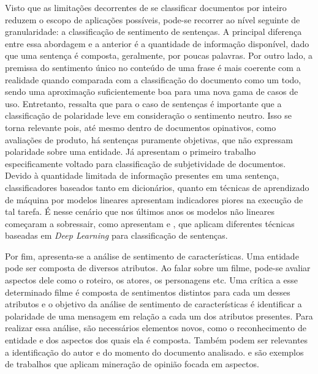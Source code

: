 Visto que as limitações decorrentes de se classificar documentos por inteiro
reduzem o escopo de aplicações possíveis, pode-se recorrer ao nível seguinte de
granularidade: a classificação de sentimento de sentenças.
A principal diferença entre essa abordagem e a anterior é a quantidade de
informação disponível, dado que uma sentença é composta, geralmente, por poucas
palavras.
Por outro lado, a premissa do sentimento único no conteúdo de uma frase é mais
coerente com a realidade quando comparada com a classificação do documento como um
todo, sendo uma aproximação suficientemente boa para uma nova gama de casos de uso.
Entretanto, \citet{liu15} ressalta que para o caso de sentenças é importante que
a classificação de polaridade leve em consideração o sentimento neutro.
Isso se torna relevante pois, até mesmo dentro de documentos opinativos, como
avaliações de produto, há sentenças puramente objetivas, que não expressam
polaridade sobre uma entidade.
Já \citet{riloff05} apresentam o primeiro trabalho especificamente voltado para
classificação de subjetividade de documentos.
Devido à quantidade limitada de informação presentes em uma sentença,
classificadores baseados tanto em dicionários, quanto em técnicas de
aprendizado de máquina por modelos lineares apresentam indicadores piores na
execução de tal tarefa.
É nesse cenário que nos últimos anos os modelos não lineares começaram a
sobressair, como apresentam \citet{socher11} e \citet{socher13}, que aplicam
diferentes técnicas baseadas em \textit{Deep Learning} para classificação de
sentenças.

Por fim, apresenta-se a análise de sentimento de características.
Uma entidade pode ser composta de diversos atributos.
Ao falar sobre um filme, pode-se avaliar aspectos dele como o roteiro, os
atores, os personagens etc.
Uma crítica a esse determinado filme é composta de sentimentos distintos para
cada um desses atributos e o objetivo da análise de sentimento de
características é identificar a polaridade de uma mensagem em relação a cada um
dos atributos presentes.
Para realizar essa análise, são necessários elementos novos, como o reconhecimento
de entidade e dos aspectos dos quais ela é composta.
Também podem ser relevantes a identificação do autor e do momento do documento
analisado.
\citet{nasukawa03} e \citet{snyder07} são exemplos de trabalhos que aplicam
mineração de opinião focada em aspectos.


